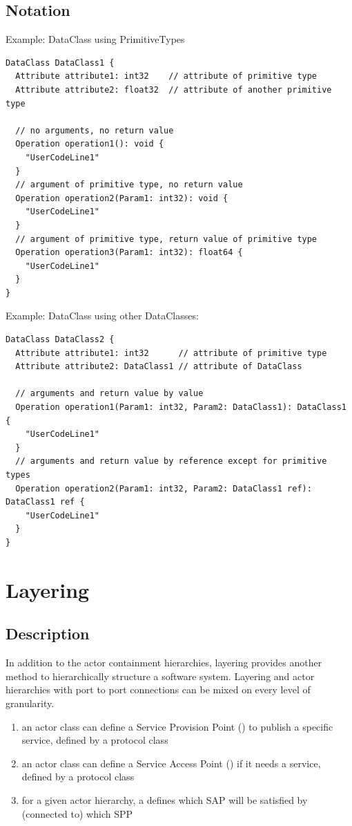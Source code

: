 \subsection{Notation}
  
Example: DataClass using PrimitiveTypes

\begin{lstlisting}
DataClass DataClass1 {
  Attribute attribute1: int32    // attribute of primitive type
  Attribute attribute2: float32  // attribute of another primitive type
  
  // no arguments, no return value
  Operation operation1(): void {
    "UserCodeLine1"
  }
  // argument of primitive type, no return value
  Operation operation2(Param1: int32): void {
    "UserCodeLine1"
  }
  // argument of primitive type, return value of primitive type
  Operation operation3(Param1: int32): float64 {
    "UserCodeLine1"
  }
}
\end{lstlisting}

Example: DataClass using other DataClasses:

\begin{lstlisting}
DataClass DataClass2 {
  Attribute attribute1: int32      // attribute of primitive type
  Attribute attribute2: DataClass1 // attribute of DataClass
  
  // arguments and return value by value
  Operation operation1(Param1: int32, Param2: DataClass1): DataClass1 {
    "UserCodeLine1"
  }
  // arguments and return value by reference except for primitive types
  Operation operation2(Param1: int32, Param2: DataClass1 ref): DataClass1 ref {
    "UserCodeLine1"
  }
}
\end{lstlisting}

\section{Layering}

\subsection{Description}

In addition to the actor containment hierarchies, layering provides another method to hierarchically 
structure a software system. Layering and actor hierarchies with port to port connections can be mixed on 
every level of granularity.

\begin{enumerate}
\item an actor class can define a Service Provision Point () to publish a specific service, defined by a 
protocol class
\item an actor class can define a Service Access Point () if it needs a service, defined by a 
protocol class
\item for a given actor hierarchy, a  defines which SAP will be satisfied by (connected to) 
which SPP
\end{enumerate}


